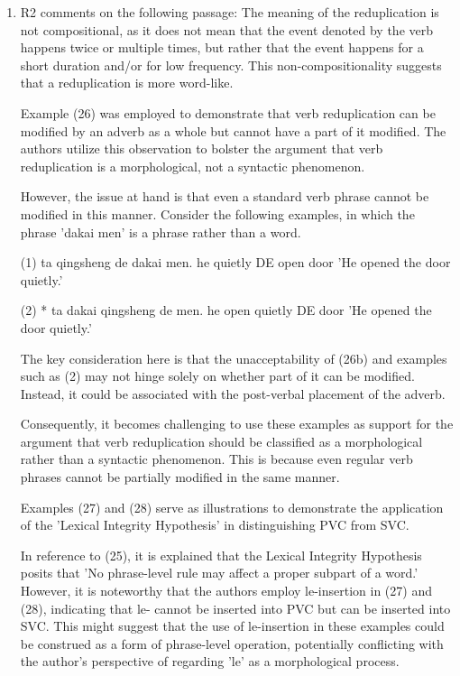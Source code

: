 \documentclass[fleqn,twoside]{article}
\begin{document}
\begin{enumerate}
\item
R2 comments on the following passage: The meaning of the reduplication is not compositional, as it does
not mean that the event denoted by the verb happens twice or multiple times, but
rather that the event happens for a short duration and/or for low frequency. This
non-compositionality suggests that a reduplication is more word-like.



Example (26) was employed to demonstrate that verb reduplication can be modified by an adverb as a whole but cannot have a part of it modified. The authors utilize this observation to bolster the argument that verb reduplication is a morphological, not a syntactic phenomenon.

However, the issue at hand is that even a standard verb phrase cannot be modified in this manner. Consider the following examples, in which the phrase 'dakai men' is a phrase rather than a word.

(1) ta qingsheng de dakai men.
       he  quietly    DE open door
      'He opened the door quietly.'

(2) * ta dakai qingsheng de men.
         he open quietly       DE door
         'He opened the door quietly.'

The key consideration here is that the unacceptability of (26b) and examples such as (2) may not hinge solely on whether part of it can be modified. Instead, it could be associated with the post-verbal placement of the adverb.

Consequently, it becomes challenging to use these examples as support for the argument that verb reduplication should be classified as a morphological rather than a syntactic phenomenon. This is because even regular verb phrases cannot be partially modified in the same manner.


Examples (27) and (28) serve as illustrations to demonstrate the application of the 'Lexical Integrity Hypothesis' in distinguishing PVC from SVC.

In reference to (25), it is explained that the Lexical Integrity Hypothesis posits that 'No
phrase-level rule may affect a proper subpart of a word.' However, it is noteworthy that the authors
employ le-insertion in (27) and (28), indicating that le- cannot be inserted into PVC but can be
inserted into SVC. This might suggest that the use of le-insertion in these examples could be
construed as a form of phrase-level operation, potentially conflicting with the author's perspective
of regarding 'le' as a morphological process.


\end{enumerate}
\end{document}
